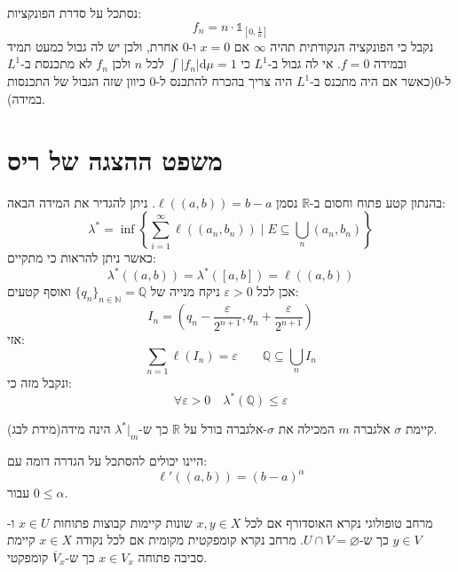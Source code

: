 \documentclass{tstextbook}
\begin{document}
\begin{example}
נסתכל על סדרת הפונקציות:
$$f_{n}=n\cdot \mathbb{1} _{\left[ 0,\frac{1}{n} \right]}$$
נקבל כי הפונקציה הנקודתית תהיה \(\infty\) אם \(x=0\) ו-0 אחרת, ולכן יש לה גבול כמעט תמיד ובמידה \(f=0\). אי לה גבול ב-\(L^{1}\) כי \(\int\lvert f_{n} \rvert \mathrm{d}\mu =1\) לכל \(n\) ולכן \(f_{n}\) לא מתכנסת ב-\(L^{1}\) ל-0(כאשר אם היה מתכנס ב-\(L^{1}\) היה צריך בהכרח להתכנס ל-0 כיוון שזה הגבול של התכנסות במידה). 

\end{example}

\section{משפט ההצגה של ריס}

\begin{example}
בהנתון קטע פתוח וחסום ב-\(\mathbb{R}\) נסמן \(\ell((a,b))=b-a\). ניתן להגדיר את המידה הבאה:
$$\lambda^{*}=\inf\left\{  \sum_{i=1}^{\infty} \ell((a_{n},b_{n}))\mid E\subseteq \bigcup_{n} (a_{n},b_{n})  \right\}$$
כאשר ניתן להראות כי מתקיים:
$$\lambda^{*}((a,b))=\lambda^{*}([a,b])=\ell((a,b))$$
אכן לכל \(\varepsilon>0\) ניקח מנייה של \(\{ q_{n} \}_{n \in \mathbb{N}}=\mathbb{Q}\) ואוסף קטעים:
$$I_{n}=\left( q_{n}-\frac{\varepsilon}{2^{n+1}},q_{n}+\frac{\varepsilon}{2^{n+1}} \right)$$
אזי:
$$\sum_{n=1}\ell(I_{n})=\varepsilon \qquad  \mathbb{Q} \subseteq \bigcup_{n}I_{n}$$
ונקבל מזה כי:
$$\forall\varepsilon>0 \quad \lambda^{*}\left( \mathbb{Q}  \right)\leq \varepsilon$$

\end{example}
\begin{theorem}
קיימת \(\sigma\) אלגברה \(m\) המכילה את \(\sigma\)-אלגברה בורל על \(\mathbb{R}\) כך ש-\(\lambda^{*}|_{m}\) הינה מידה(מידת לבג).

\end{theorem}
\begin{remark}
היינו יכולים להסתכל על הגדרה דומה עם:
$$\ell'((a,b))=(b-a)^{\alpha}$$
עבור \(0\leq \alpha\).

\end{remark}
\begin{reminder}
מרחב טופולוגי נקרא האוסדורף אם לכל \(x,y \in X\) שונות קיימות קבוצות פתוחות \(x \in U\) ו-\(y\in V\) כך ש-\(U\cap V = \varnothing\).
מרחב נקרא קומפקטית מקומית אם לכל נקודה \(x \in X\) קיימת סביבה פתוחה \(x \in V_{x}\) כך ש-\(\overline{V}_{x}\) קומפקטי.

\end{reminder}
\end{document}
